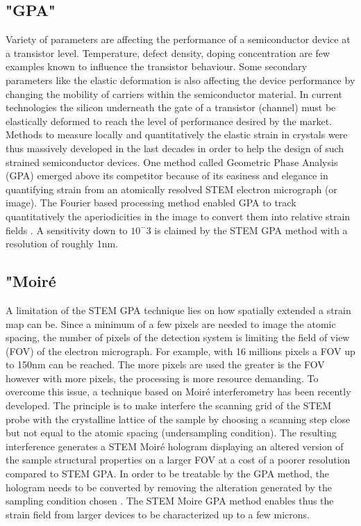\documentclass{article}
\begin{document}
\subsection{"GPA"}
Variety of parameters are affecting the performance of a semiconductor device at a transistor level. Temperature, defect density, doping concentration are few examples known to influence the transistor behaviour. Some secondary parameters like the elastic deformation is also affecting the device performance by changing the mobility of carriers within the semiconductor material. In current technologies the silicon underneath the gate of a transistor (channel) must be elastically deformed to reach the level of performance desired by the market. Methods to measure locally and quantitatively the elastic strain in crystals were thus massively developed in the last decades in order to help the design of such strained semiconductor devices. One method called Geometric Phase Analysis (GPA) emerged above its competitor because of its easiness and elegance in quantifying strain from an atomically resolved STEM electron micrograph (or image). The Fourier based processing method enabled GPA to track quantitatively the aperiodicities in the image to convert them into relative strain fields \cite{Hytch1998}. A sensitivity down to $10^-{3}$ is claimed by the STEM GPA method with a resolution of roughly 1nm.
\subsection{"Moir{\'e}}
A limitation of the STEM GPA technique lies on how spatially extended a strain map can be. Since a minimum of a few pixels are needed to image the atomic spacing, the number of pixels of the detection system is limiting the field of view (FOV) of the electron micrograph. For example, with 16 millions pixels a FOV up to 150nm can be reached. The more pixels are used the greater is the FOV however with more pixels, the processing is more resource demanding. To overcome this issue, a technique based on Moir{\'e} interferometry has been recently developed. The principle is to make interfere the scanning grid of the STEM probe with the crystalline lattice of the sample by choosing a scanning step close but not equal to the atomic spacing (undersampling condition). The resulting interference generates a STEM Moir{\'e }hologram displaying an altered version of the sample structural properties on a larger FOV at a cost of a poorer resolution compared to STEM GPA. In order to be treatable by the GPA method, the hologram needs to be converted by removing the alteration generated by the sampling condition chosen \cite{Pofelski2017}. The STEM Moire GPA method enables thus the strain field from larger devices to be characterized up to a few microns.
\end{document}
